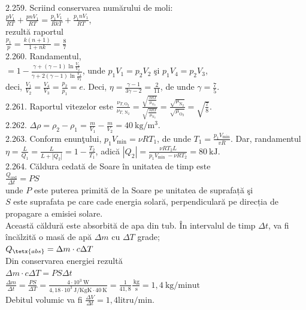 2.259. Scriind conservarea numărului de moli:\\ $\frac{p V_{1}}{R T}+\frac{p n V_{1}}{R T}=\frac{p_{1} V_{1}}{R k T}+\frac{p_{1} n V_{1}}{R T}$, \\ rezultă raportul\\ $\frac{p_{1}}{p}=\frac{k(n+1)}{1+n k}=\frac{8}{7}$\\

2.260. Randamentul,\\ $=1-\frac{\gamma+(\gamma-1) \ln \frac{V_{1}}{V_{2}}}{\gamma+2(\gamma-1) \ln \frac{V_{4}}{V_{3}}}$, unde $p_{1} V_{1}=p_{2} V_{2}$ şi $p_{1} V_{4}=p_{2} V_{3}$,\\ deci, $\frac{V_{1}}{V_{2}}=\frac{V_{4}}{V_{3}}=\frac{p_{2}}{p_{1}}=e$. Deci, $\eta=\frac{\gamma-1}{3 \gamma-2}=\frac{2}{11}$, de unde $\gamma=\frac{7}{5}$.\\

2.261. Raportul vitezelor este $\frac{\nu_{T, \mathrm{O}_{2}}}{\nu_{T, \mathrm{~N}_{2}}}=\frac{\sqrt{\frac{3 R T}{\mu_{\mathrm{O}_{2}}}}}{\sqrt{\frac{3 R T}{\mu_{\mathrm{N}_{2}}}}}=\frac{\sqrt{\mu_{\mathrm{N}_{2}}}}{\sqrt{\mu_{\mathrm{O}_{2}}}}=\sqrt{\frac{7}{8}}$.\\

2.262. $\Delta \rho=\rho_{2}-\rho_{1}=\frac{m}{V_{1}}-\frac{m}{V_{2}}=40 \mathrm{~kg} / \mathrm{m}^{3}$.\\

2.263. Conform enunţului, $p_{1} V_{\min }=\nu R T_{1}$, de unde $T_{1}=\frac{p_{1} V_{\min }}{v R}$. Dar, randamentul $\eta=\frac{L}{Q_{1}}=\frac{L}{L+\left|Q_{2}\right|}=1-\frac{T_{2}}{T_{1}}$, adică $\left|Q_{2}\right|=\frac{\nu R T_{2} L}{p_{1} V_{\text {min }}-\nu R T_{2}}=80 \mathrm{~kJ}$.\\

2.264. Căldura cedată de Soare în unitatea de timp este\\ $\frac{Q_{\text{ced}}}{\Delta t}=P S$\\ unde $P$ este puterea primită de la Soare pe unitatea de suprafață şi\\ $S$ este suprafata pe care cade energia solară, perpendiculară pe direcția de propagare a emisiei solare.\\ Această căldură este absorbită de apa din tub. În intervalul de timp $\Delta t$, va fi încălzită o masă de apă $\Delta m$ cu $\Delta T$ grade;\\ $Q_{\tetx{abs}}=\Delta m \cdot c \Delta T$\\ Din conservarea energiei rezultă\\ $\Delta m \cdot c \Delta T=P S \Delta t$\\ $\frac{\Delta m}{\Delta t}=\frac{P S}{\Delta T}=\frac{4 \cdot 10^{3} \mathrm{~W}}{4,18 \cdot 10^{3} \mathrm{~J} / \mathrm{KgK} \cdot 40 \mathrm{~K}}=\frac{1}{41,8} \frac{\mathrm{~kg}}{\mathrm{~s}}=1,4 \mathrm{~kg} / \mathrm{minut}$\\ Debitul volumic va fi $\frac{\Delta V}{\Delta t}=1,4 \mathrm{litru} / \mathrm{min}$.\\ 

